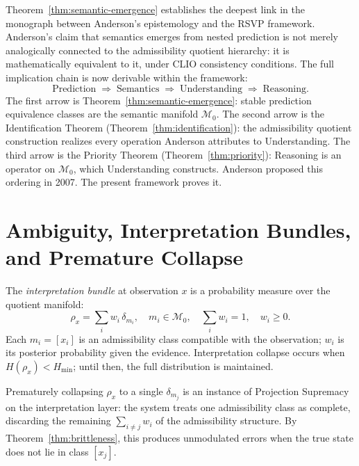 \documentclass[12pt, a4paper, oneside]{book}
\newcommand{\M}{\mathcal{M}}
\begin{document}
\begin{remark}
Theorem~\ref{thm:semantic-emergence} establishes the deepest link in the
monograph between Anderson's epistemology and the RSVP framework.
Anderson's claim that semantics emerges from nested prediction is not
merely analogically connected to the admissibility quotient hierarchy:
it is mathematically equivalent to it, under CLIO consistency conditions.
The full implication chain is now derivable within the framework:
\[
  \text{Prediction} \;\Longrightarrow\;
  \text{Semantics} \;\Longrightarrow\;
  \text{Understanding} \;\Longrightarrow\;
  \text{Reasoning}.
\]
The first arrow is Theorem~\ref{thm:semantic-emergence}: stable
prediction equivalence classes are the semantic manifold $\M_0$.
The second arrow is the Identification Theorem
(Theorem~\ref{thm:identification}): the admissibility quotient
construction realizes every operation Anderson attributes to
Understanding.
The third arrow is the Priority Theorem (Theorem~\ref{thm:priority}):
Reasoning is an operator on $\M_0$, which Understanding constructs.
Anderson proposed this ordering in 2007. The present framework proves it.
\end{remark}

\section{Ambiguity, Interpretation Bundles, and Premature Collapse}

\begin{definition}
\label{def:interp-bundle}
The \emph{interpretation bundle} at observation $x$ is a probability
measure over the quotient manifold:
\[
  \rho_x = \sum_i w_i \,\delta_{m_i}, \quad
  m_i \in \M_0, \quad \sum_i w_i = 1, \quad w_i \geq 0.
\]
Each $m_i = [x_i]$ is an admissibility class compatible with the
observation; $w_i$ is its posterior probability given the evidence.
Interpretation collapse occurs when $H(\rho_x) < H_{\min}$; until
then, the full distribution is maintained.
\end{definition}

\begin{proposition}
\label{prop:premature-collapse}
Prematurely collapsing $\rho_x$ to a single $\delta_{m_j}$ is an
instance of Projection Supremacy on the interpretation layer:
the system treats one admissibility class as complete, discarding
the remaining $\sum_{i \neq j} w_i$ of the admissibility structure.
By Theorem~\ref{thm:brittleness}, this produces unmodulated errors
when the true state does not lie in class $[x_j]$.
\end{proposition}
\end{document}
